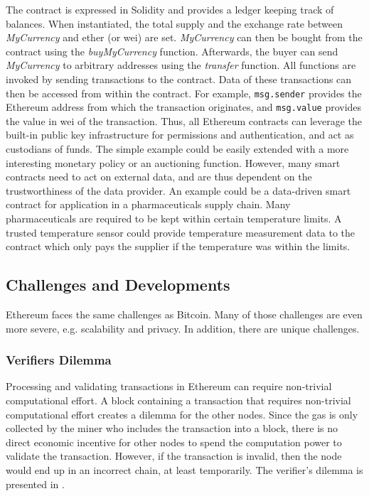 The contract is expressed in Solidity and provides a ledger keeping track of balances. When instantiated, the total supply and the exchange rate between \emph{MyCurrency} and ether (or wei) are set. \emph{MyCurrency} can then be bought from the contract using the \emph{buyMyCurrency} function. Afterwards, the buyer can send \emph{MyCurrency} to arbitrary addresses using the \emph{transfer} function. All functions are invoked by sending transactions to the contract. Data of these transactions can then be accessed from within the contract. For example, \texttt{msg.sender} provides the Ethereum address from which the transaction originates, and \texttt{msg.value} provides the value in wei of the transaction. Thus, all Ethereum contracts can leverage the built-in public key infrastructure for permissions and authentication, and act as custodians of funds. The simple example could be easily extended with a more interesting monetary policy or an auctioning function. However, many smart contracts need to act on external data, and are thus dependent on the trustworthiness of the data provider. An example could be a data-driven smart contract for application in a pharmaceuticals supply chain. Many pharmaceuticals are required to be kept within certain temperature limits. A trusted temperature sensor could provide temperature measurement data to the contract which only pays the supplier if the temperature was within the limits. 


\subsection{Challenges and Developments}

Ethereum faces the same challenges as Bitcoin. Many of those challenges are even more severe, e.g. scalability and privacy. In addition, there are unique challenges.

\subsubsection{Verifiers Dilemma}
Processing and validating transactions in Ethereum can require non-trivial computational effort.
A block containing a transaction that requires non-trivial computational effort creates a dilemma for the other nodes. Since the gas is only collected by the miner who includes the transaction into a block, there is no direct economic incentive for other nodes to spend the computation power to validate the transaction. However, if the transaction is invalid, then the node would end up in an incorrect chain, at least temporarily.
The verifier's dilemma is presented in \parencite{Luu:2015:DIC:2810103.2813659}.


